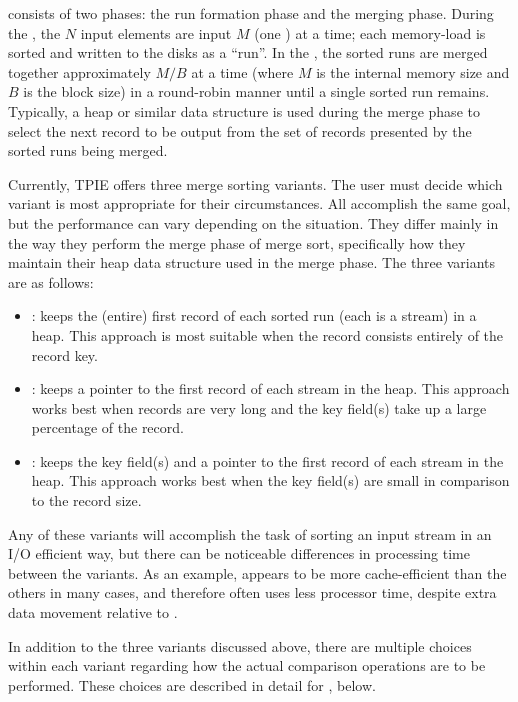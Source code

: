 \noindent
{} consists of two phases: the run formation
phase and the merging phase.  During the , the $N$ input elements are input $M$ (one )
at a time; each memory-load is sorted and written to the
disks as a ``run''.  In the , the sorted
runs are merged together approximately $M/B$ at a time (where $M$
is the internal memory size and $B$ is the block size) in a
round-robin manner until a single sorted run remains.
Typically, a heap or similar data structure is used during
the merge phase to select the next record to be output from
the set of records presented by the sorted runs being
merged. 

Currently, TPIE offers three merge sorting variants. The
user must decide which variant is most appropriate for their
circumstances.  All accomplish the same goal, but the
performance can vary depending on the situation. They differ
mainly in the way they perform the merge phase of merge
sort, specifically how they maintain their heap data
structure used in the merge phase. The three variants are as
follows:
\begin{itemize}
    \item {}: keeps the (entire) first record
    of each sorted run (each is a stream) in a heap. This
    approach is most suitable when the record consists
    entirely of the record key.
    
    \item {}: keeps a pointer to the
    first record of each stream in the heap. This approach
    works best when records are very long and the key
    field(s) take up a large percentage of the record.

    \item {}: keeps the key field(s) and
    a pointer to the first record of each stream in the
    heap. This approach works best when the key field(s) are
    small in comparison to the record size.
\end{itemize}

Any of these variants will accomplish the task of sorting an
input stream in an I/O efficient way, but there can be
noticeable differences in processing time between the
variants. As an example,  appears to be
more cache-efficient than the others in many cases, and
therefore often uses less processor time, despite extra data
movement relative to .

In addition to the three variants discussed above, there are
multiple choices within each variant regarding how the
actual comparison operations are to be performed. These
choices are described in detail for , below.

